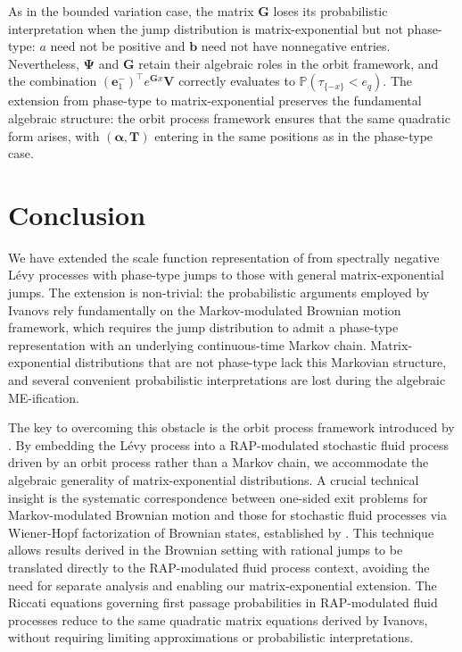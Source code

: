 \documentclass[a4paper,11pt]{article}
\numberwithin{equation}{section}
\theoremstyle{plain}
\theoremstyle{definition}
\newcommand{\1}{\mathbf{1}}
\newcommand{\PP}{\mathbb{P}}
\begin{document}
As in the bounded variation case, the matrix $\bm{G}$ loses its probabilistic interpretation when the jump distribution is matrix-exponential but not phase-type: $a$ need not be positive and $\bm{b}$ need not have nonnegative entries. Nevertheless, $\bm{\Psi}$ and $\bm{G}$ retain their algebraic roles in the orbit framework, and the combination $(\bm{e}_1^-)^\intercal e^{\bm{G}x}\bm{V}$ correctly evaluates to $\PP(\tau_{\{-x\}}<e_q)$. The extension from phase-type to matrix-exponential preserves the fundamental algebraic structure: the orbit process framework ensures that the same quadratic form arises, with $(\bm{\alpha}, \bm{T})$ entering in the same positions as in the phase-type case.



\section{Conclusion}\label{sec:conclusion}

We have extended the scale function representation of \cite{Ivanovs2021} from spectrally negative Lévy processes with phase-type jumps to those with general matrix-exponential jumps. The extension is non-trivial: the probabilistic arguments employed by Ivanovs rely fundamentally on the Markov-modulated Brownian motion framework, which requires the jump distribution to admit a phase-type representation with an underlying continuous-time Markov chain. Matrix-exponential distributions that are not phase-type lack this Markovian structure, and several convenient probabilistic interpretations are lost during the algebraic ME-ification.

The key to overcoming this obstacle is the orbit process framework introduced by \cite{BeanNguyenNielsenPeralta2022}. By embedding the Lévy process into a RAP-modulated stochastic fluid process driven by an orbit process rather than a Markov chain, we accommodate the algebraic generality of matrix-exponential distributions. A crucial technical insight is the systematic correspondence between one-sided exit problems for Markov-modulated Brownian motion and those for stochastic fluid processes via Wiener-Hopf factorization of Brownian states, established by \cite{NguyenPeralta2019}. This technique allows results derived in the Brownian setting with rational jumps to be translated directly to the RAP-modulated fluid process context, avoiding the need for separate analysis and enabling our matrix-exponential extension. The Riccati equations governing first passage probabilities in RAP-modulated fluid processes reduce to the same quadratic matrix equations derived by Ivanovs, without requiring limiting approximations or probabilistic interpretations.
\end{document}
